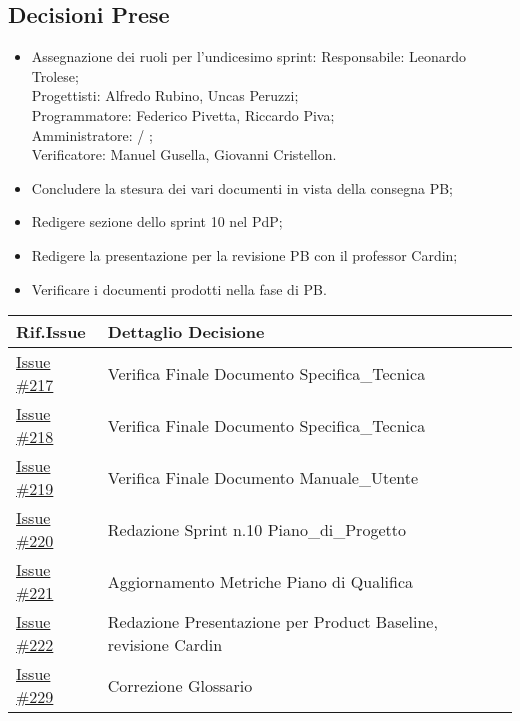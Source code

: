 \documentclass[10pt]{article}
\begin{document}
\subsection{Decisioni Prese}
    \begin{itemize}
        \item   Assegnazione dei ruoli per l'undicesimo sprint:
                Responsabile: Leonardo Trolese;\\
                Progettisti: Alfredo Rubino, Uncas Peruzzi;\\
                Programmatore: Federico Pivetta, Riccardo Piva;\\
                Amministratore: / ;\\
                Verificatore: Manuel Gusella, Giovanni Cristellon.
        \item Concludere la stesura dei vari documenti in vista della consegna PB;
        \item Redigere sezione dello sprint 10 nel PdP;
        \item Redigere la presentazione per la revisione PB con il professor Cardin;
        \item Verificare i documenti prodotti nella fase di PB.
    \end{itemize}
    \begin{center}
    \begin{tabular}{|>{\centering\arraybackslash}m{3cm}|>{\centering\arraybackslash}m{12cm}|}
	\hline
	\textbf{Rif.Issue} & \textbf{Dettaglio Decisione}\\
	\hline
            \href{https://github.com/SevenBitsSwe/7BitsDocs/issues/217}{Issue \#217} & Verifica Finale Documento Specifica_Tecnica\\
            \href{https://github.com/SevenBitsSwe/7BitsDocs/issues/218}{Issue \#218} & Verifica Finale Documento Specifica_Tecnica\\
            \href{https://github.com/SevenBitsSwe/7BitsDocs/issues/219}{Issue \#219} & Verifica Finale Documento Manuale_Utente\\
            \href{https://github.com/SevenBitsSwe/7BitsDocs/issues/220}{Issue \#220} & Redazione Sprint n.10 Piano_di_Progetto\\
            \href{https://github.com/SevenBitsSwe/7BitsDocs/issues/221}{Issue \#221} & Aggiornamento Metriche Piano di Qualifica\\
            \href{https://github.com/SevenBitsSwe/7BitsDocs/issues/222}{Issue \#222} & Redazione Presentazione per Product Baseline, revisione Cardin\\
            \href{https://github.com/SevenBitsSwe/7BitsDocs/issues/229}{Issue \#229} & Correzione Glossario\\
        \hline
    \end{tabular}
    \end{center}
\end{document}

